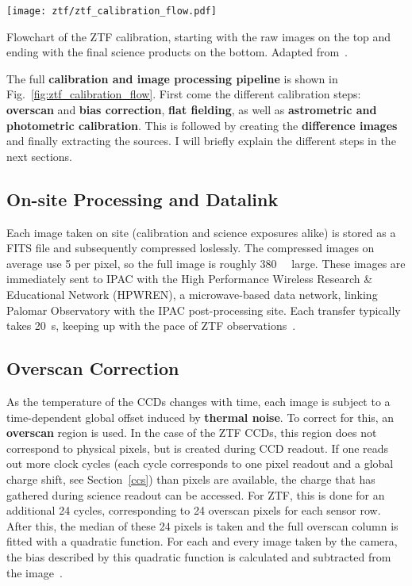 \begin{marginfigure}
    \texttt{[image: ztf/ztf\_calibration\_flow.pdf]}
    \caption[ZTF realtime flowchart]{Flowchart of the ZTF calibration, starting with the raw images on the top and ending with the final science products on the bottom. Adapted from~\cite{Laher2018}.}
\end{marginfigure}

The full \textbf{calibration and image processing pipeline} is shown in Fig.~\ref{fig:ztf_calibration_flow}. First come the different calibration steps: \textbf{overscan} and \textbf{bias correction}, \textbf{flat fielding}, as well as \textbf{astrometric and photometric calibration}. This is followed by creating the \textbf{difference images} and finally extracting the sources. I will briefly explain the different steps in the next sections.

\subsection{On-site Processing and Datalink}\label{ztf_data_link}

Each image taken on site (calibration and science exposures alike) is stored as a FITS file and subsequently compressed loslessly. The compressed images on average use \SI{5}{\bit} per pixel, so the full image is roughly \SI{380}{\mega\byte} large. These images are immediately sent to IPAC with the High Performance Wireless Research \& Educational Network (HPWREN), a microwave-based data network, linking Palomar Observatory with the IPAC post-processing site. Each transfer typically takes \SI{20}{\second}, keeping up with the pace of ZTF observations~\cite{Dekany2020}.

\subsection{Overscan Correction}
As the temperature of the CCDs changes with time, each image is subject to a time-dependent global offset induced by \textbf{thermal noise}. To correct for this, an \textbf{overscan} region is used. In the case of the ZTF CCDs, this region does not correspond to physical pixels, but is created during CCD readout. If one reads out more clock cycles (each cycle corresponds to one pixel readout and a global charge shift, see Section~\ref{ccs}) than pixels are available, the charge that has gathered during science readout can be accessed. For ZTF, this is done for an additional 24 cycles, corresponding to 24 overscan pixels for each sensor row. After this, the median of these 24 pixels is taken and the full overscan column is fitted with a quadratic function. For each and every image taken by the camera, the bias described by this quadratic function is calculated and subtracted from the image~\cite{Masci2019a}.

